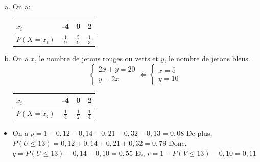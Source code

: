 \documentclass[12pt, a4paper]{article}
\begin{document}
    \begin{Exercise}[number={36}]
      \begin{enumerate}[a)]
        \item On a:
              \begin{center}\begin{tabular}{ | l || *{3}{c|} }
                \hline      
                $x_i$                     & -4            & 0             & 2             \\ \hline
                $P(X=x_i)$ \hspace{0.5cm} & $\frac{1}{9}$ & $\frac{5}{9}$ & $\frac{1}{3}$ \\ \hline
              \end{tabular}\end{center}
              \parbox{\linewidth}{}

        \item On a $x$, le nombre de jetons rouges ou verts et $y$, le nombre de jetons bleus.
              \begin{equation*}
                \begin{cases}2x+y=20\\y=2x\end{cases}\iff\begin{cases}x=5\\y=10\end{cases}
              \end{equation*} \medbreak
              \begin{center}\begin{tabular}{ | l || *{3}{c|} }
                \hline
                $x_i$                     & -4            & 0             & 2             \\ \hline
                $P(X=x_i)$ \hspace{0.5cm} & $\frac{1}{4}$ & $\frac{1}{2}$ & $\frac{1}{4}$ \\ \hline
              \end{tabular}\end{center}
              \parbox{\linewidth}{}

      \end{enumerate}
    \end{Exercise}

    \clearpage

    \begin{Exercise}[number={39}]
      \begin{itemize}
        \item[] On a $p=1-0{,}12-0{,}14-0{,}21-0{,}32-0{,}13=0{,}08$ \medbreak
                De plus, $P(U\leq 13)=0{,}12+0{,}14+0{,}21+0{,}32=0{,}79$ \medbreak
                Donc, $q=P(U\leq 13)-0{,}14-0{,}10=0{,}55$ \medbreak
                Et, $r=1-P(V\leq 13)-0{,}10=0{,}11$
      \end{itemize}
    \end{Exercise}
\end{document}
